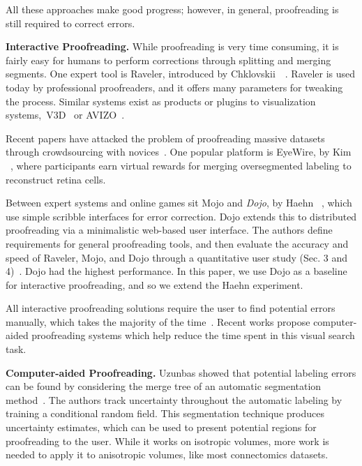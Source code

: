 All these approaches make good progress; however, in general, proofreading is still required to correct errors. 


\textbf{Interactive Proofreading.} While proofreading is very time consuming, it is fairly easy for humans to perform corrections through splitting and merging segments. One expert tool is Raveler, introduced by Chklovskii~\etal~\cite{chklovskii2010, raveler}. Raveler is used today by professional proofreaders, and it offers many parameters for tweaking the process. Similar systems exist as products or plugins to visualization systems,~\eg V3D~\cite{proofreading_bottleneck} or AVIZO~\cite{markus_proofreading}. 

Recent papers have attacked the problem of proofreading massive datasets through crowdsourcing with novices~\cite{saalfeld09,anderson2011,Giuly2013DP2}. One popular platform is EyeWire, by Kim \etal~\cite{eyewire_nature}, where participants earn virtual rewards for merging oversegmented labeling to reconstruct retina cells.

Between expert systems and online games sit Mojo and \textit{Dojo}, by Haehn \etal~\cite{haehn_dojo_2014,Neuroblocks}, which use simple scribble interfaces for error correction. Dojo extends this to distributed proofreading via a minimalistic web-based user interface. The authors define requirements for general proofreading tools, and then evaluate the accuracy and speed of Raveler, Mojo, and Dojo through a quantitative user study (Sec. 3 and 4)~\cite{haehn_dojo_2014}. Dojo had the highest performance. In this paper, we use Dojo as a baseline for interactive proofreading, and so we extend the Haehn \etal experiment.

All interactive proofreading solutions require the user to find potential errors manually, which takes the majority of the time~\cite{proofreading_bottleneck,haehn_dojo_2014}. Recent works propose computer-aided proofreading systems which help reduce the time spent in this visual search task.

\textbf{Computer-aided Proofreading.} Uzunbas \etal showed that potential labeling errors can be found by considering the merge tree of an automatic segmentation method~\cite{uzunbas}. The authors track uncertainty throughout the automatic labeling by training a conditional random field. This segmentation technique produces uncertainty estimates, which can be used to present potential regions for proofreading to the user. While it works on isotropic volumes, more work is needed to apply it to anisotropic volumes, like most connectomics datasets.

